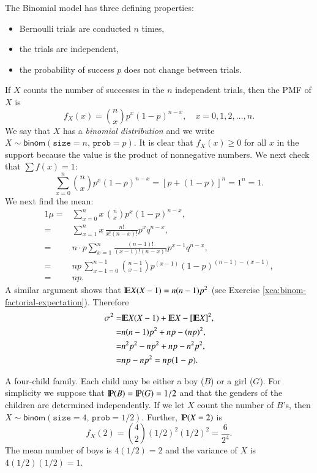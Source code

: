 \documentclass[captions=tableheading]{scrbook}
\begin{document}
The Binomial model has three defining properties:
\begin{itemize}
\item Bernoulli trials are conducted \(n\) times,
\item the trials are independent,
\item the probability of success \(p\) does not change between trials.
\end{itemize}
If \(X\) counts the number of successes in the \(n\) independent trials, then the PMF of \(X\) is 
\begin{equation}
f_{X}(x)={n \choose x}p^{x}(1-p)^{n-x},\quad x=0,1,2,\ldots,n.
\end{equation}
We say that \(X\) has a \emph{binomial distribution} and we write \(X\sim\mathsf{binom}(\mathtt{size}=n,\,\mathtt{prob}=p)\). It is clear that \(f_{X}(x)\geq0\) for all \(x\) in the support because the value is the product of nonnegative numbers. We next check that \(\sum f(x)=1\):
\[
\sum_{x=0}^{n}{n \choose x}p^{x}(1-p)^{n-x}=[p+(1-p)]^{n}=1^{n}=1.
\]
We next find the mean:
\begin{alignat*}{1}
\mu= & \sum_{x=0}^{n}x\,{n \choose x}p^{x}(1-p)^{n-x},\\
= & \sum_{x=1}^{n}x\,\frac{n!}{x!(n-x)!}p^{x}q^{n-x},\\
= & n\cdot p\sum_{x=1}^{n}\frac{(n-1)!}{(x-1)!(n-x)!}p^{x-1}q^{n-x},\\
= & np\,\sum_{x-1=0}^{n-1}{n-1 \choose x-1}p^{(x-1)}(1-p)^{(n-1)-(x-1)},\\
= & np.
\end{alignat*}
A similar argument shows that \(\E X(X-1)=n(n-1)p^{2}\) (see Exercise \ref{xca:binom-factorial-expectation}). Therefore
\begin{alignat*}{1}
\sigma^{2}= & \E X(X-1)+\E X-[\E X]^{2},\\
= & n(n-1)p^{2}+np-(np)^{2},\\
= & n^{2}p^{2}-np^{2}+np-n^{2}p^{2},\\
= & np-np^{2}=np(1-p).
\end{alignat*}

\begin{example}
A four-child family. Each child may be either a boy (\(B\)) or a girl (\(G\)). For simplicity we suppose that \(\P(B)=\P(G)=1/2\) and that the genders of the children are determined independently. If we let \(X\) count the number of \(B\)'s, then \(X\sim\mathsf{binom}(\mathtt{size}=4,\,\mathtt{prob}=1/2)\). Further, \(\P(X=2)\) is
\[
f_{X}(2)={4 \choose 2}(1/2)^{2}(1/2)^{2}=\frac{6}{2^{4}}.
\]
The mean number of boys is \(4(1/2)=2\) and the variance of \(X\) is \(4(1/2)(1/2)=1\).
\end{example}
\end{document}
